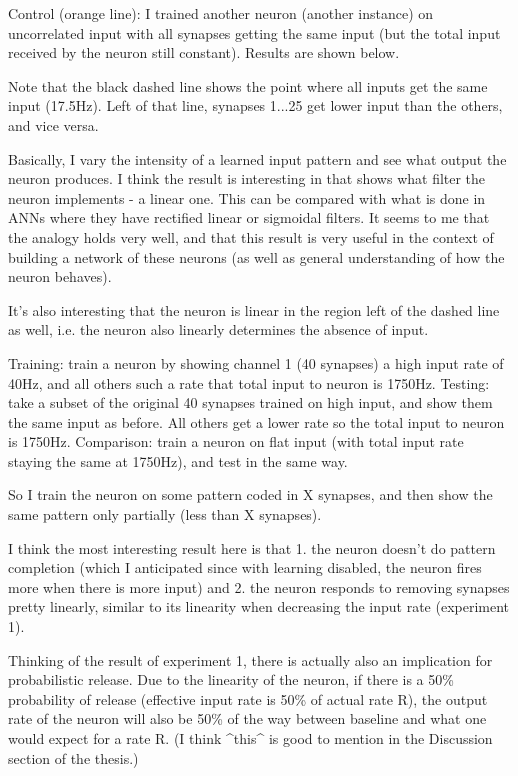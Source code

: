 \documentclass[a4paper,12pt]{report}
\theoremstyle{definition}
\begin{document}
Control (orange line): I trained another neuron (another instance) on uncorrelated input with all synapses getting the same input (but the total input received by the neuron still constant). Results are shown below.

Note that the black dashed line shows the point where all inputs get the same input (17.5Hz). Left of that line, synapses 1...25 get lower input than the others, and vice versa.

Basically, I vary the intensity of a learned input pattern and see what output the neuron produces. I think the result is interesting in that  shows what filter the neuron implements - a linear one. This can be compared with what is done in ANNs where they have rectified linear or sigmoidal filters. It seems to me that the analogy holds very well, and that this result is very useful in the context of building a network of these neurons (as well as general understanding of how the neuron behaves).

It's also interesting that the neuron is linear in the region left of the dashed line as well, i.e. the neuron also linearly determines the absence of input.

Training: train a neuron by showing channel 1 (40 synapses) a high input rate of 40Hz, and all others such a rate that total input to neuron is 1750Hz.
Testing: take a subset of the original 40 synapses trained on high input, and show them the same input as before. All others get a lower rate so the total input to neuron is 1750Hz.
Comparison: train a neuron on flat input (with total input rate staying the same at 1750Hz), and test in the same way.

So I train the neuron on some pattern coded in X synapses, and then show the same pattern only partially (less than X synapses).

I think the most interesting result here is that
1. the neuron doesn't do pattern completion (which I anticipated since with learning disabled, the neuron fires more when there is more input) and
2. the neuron responds to removing synapses pretty linearly, similar to its linearity when decreasing the input rate (experiment 1).

Thinking of the result of experiment 1, there is actually also an implication for probabilistic release. Due to the linearity of the neuron, if there is a 50\% probability of release (effective input rate is 50\% of actual rate R), the output rate of the neuron will also be 50\% of the way between baseline and what one would expect for a rate R.
(I think ^this^ is good to mention in the Discussion section of the thesis.)
\end{document}
